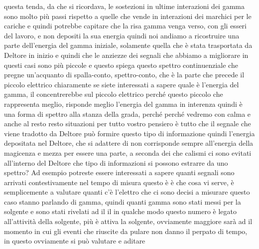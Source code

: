 questa tenda, da che si ricordava, le sostezioni in ultime interazioni dei gamma sono molto più passi rispetto a quelle che vende in interazioni dei marchici per le cariche e quindi potrebbe capitare che la risa gamma venga verso, con gli esseri del lavoro, e non depositi la sua energia quindi noi andiamo a ricostruire una parte dell'energia del gamma iniziale, solamente quella che è stata trasportata da Deltore in inizio e quindi che le anziezze dei segnali che abbiamo a migliorare in questi casi sono più piccole e questo spiega questo spettro continuenziale che pregne un'acquanto di spalla-conto, spettro-conto, che è la parte che precede il piccolo elettrico chiaramente se siete interessati a sapere quale è l'energia del gamma, il concentrerebbe sul piccolo elettrico perché questo piccolo che rappresenta meglio, risponde meglio l'energia del gamma in interenza quindi è una forma di spettro alla stanza della grada, perché perché vedremo con calma e anche al resto resto situazioni per tutto vostro pensiero è tutto che il segnale che viene tradotto da Deltore può formire questo tipo di informazione quindi l'energia depositata nel Deltore, che si adattere di non corrisponde sempre all'energia della magicenza e mezza per essere una parte, a seconda dei che calismi ci sono evitati all'interno del Deltore che tipo di informazioni si possono estrarre da uno spettro? Ad esempio potreste essere interessati a sapere quanti segnali sono arrivati contestivamente nel tempo di misura questo è è che cosa vi serve, è semplicemente a valutare quanti c'è l'elettro che ci sono decisi a misurare questo caso stanno parlando di gamma, quindi quanti gamma sono stati messi per la solgente e sono stati rivelati ad il il in qualche modo questo numero è legato all'attività della solgente, più è attiva la solgente, ovviamente maggiore sarà ad il momento in cui gli eventi che riuscite da pulare non danno il perpato di tempo, in questo ovviamente si può valutare e aditare

